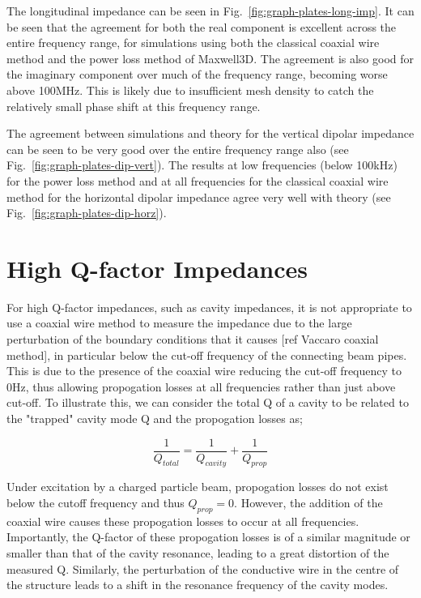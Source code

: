 The longitudinal impedance can be seen in Fig.~\ref{fig:graph-plates-long-imp}. It can be seen that the agreement for both the real component is excellent across the entire frequency range, for simulations using both the classical coaxial wire method and the power loss method of Maxwell3D. The agreement is also good for the imaginary component over much of the frequency range, becoming worse above 100MHz. This is likely due to insufficient mesh density to catch the relatively small phase shift at this frequency range.

The agreement between simulations and theory for the vertical dipolar impedance can be seen to be very good over the entire frequency range also (see Fig.~\ref{fig:graph-plates-dip-vert}). The results at low frequencies (below 100kHz) for the power loss method and at all frequencies for the classical coaxial wire method for the horizontal dipolar impedance agree very well with theory (see Fig.~\ref{fig:graph-plates-dip-horz}). 

\section{High Q-factor Impedances}

For high Q-factor impedances, such as cavity impedances, it is not appropriate to use a coaxial wire method to measure the impedance due to the large perturbation of the boundary conditions that it causes [ref Vaccaro coaxial method], in particular below the cut-off frequency of the connecting beam pipes. This is due to the presence of the coaxial wire reducing the cut-off frequency to 0Hz, thus allowing propogation losses at all frequencies rather than just above cut-off. To illustrate this, we can consider the total Q of a cavity to be related to the "trapped" cavity mode Q and the propogation losses as;

\begin{equation}
\frac{1}{Q_{total}} = \frac{1}{Q_{cavity}} + \frac{1}{Q_{prop}}
\end{equation}

Under excitation by a charged particle beam, propogation losses do not exist below the cutoff frequency and thus $Q_{prop} = 0$. However, the addition of the coaxial wire causes these propogation losses to occur at all frequencies. Importantly, the Q-factor of these propogation losses is of a similar magnitude or smaller than that of the cavity resonance, leading to a great distortion of the measured Q. Similarly, the perturbation of the conductive wire in the centre of the structure leads to a shift in the resonance frequency of the cavity modes. 

